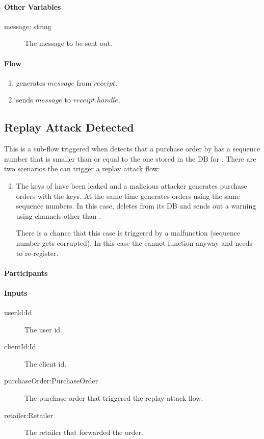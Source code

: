 \documentclass[a4paper,10pt,draft]{article}
\begin{document}
\paragraph{Other Variables}
\SpecialItem
\begin{description}
 \item[message: string] The message to be sent out.
\end{description}

\paragraph{Flow}

\begin{enumerate}
 \item \Server{} generates $message$ from $receipt$.
 \item \Server{} sends $message$ to $receipt.handle$.
\end{enumerate}

\subsection{Replay Attack Detected}
\label{replay_attack_flow}
This is a sub-flow triggered when \Server{} detects that a purchase order by 
\Client{} has a sequence number that is smaller than or equal to the one stored 
in the DB for \Client{}. There are two scenarios the can trigger a replay 
attack flow:

\begin{enumerate}
 \item The keys of \Client{} have been leaked and a malicious attacker 
generates purchase orders with the keys. At the same time \Client{} generates 
orders using the same sequence numbers. In this case, \Server{} deletes 
\Client{} from its DB and sends out a warning using channels other than 
\Client{}.

There is a chance that this case is triggered by a \Client{} malfunction 
(sequence number gets corrupted). In this case the \Client{} cannot function 
anyway and \User{} needs to re-register.
\end{enumerate}

\paragraph{Participants} \Server{}

\paragraph{Inputs}
\SpecialItem
\begin{description}
 \item[userId:Id] The user id.
 \item[clientId:Id] The client id.
 \item[purchaseOrder:PurchaseOrder] The purchase order that triggered the 
replay attack flow.
 \item[retailer:Retailer] The retailer that forwarded the order.
\end{description}
\end{document}
